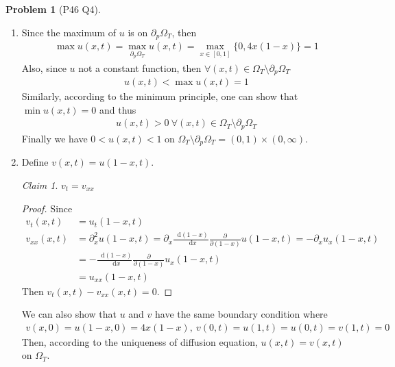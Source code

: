 \documentclass[twoside,11pt]{article}
\renewcommand*\d{\mathop{}\!\mathrm{d}}
\theoremstyle{definition}
\newtheorem{problem}{Problem}
\theoremstyle{remark}
\newtheorem*{claim}{Claim}
\begin{document}
\newpage
\begin{problem}[P46 Q4]\
    \begin{enumerate}
        \item Since the maximum of $u$ is on $\partial_p\Omega_T$, then 
        \begin{align*}
            \max u(x, t) = \max_{\partial_p\Omega_T}u(x, t) = \max_{x\in[0, 1]}\{0, 4x(1-x)\} = 1
        \end{align*}
        Also, since $u$ not a constant function, then $\forall (x, t)\in\Omega_T\setminus\partial_p\Omega_T$
        \begin{align*}
            u(x, t) < \max u(x, t) = 1
        \end{align*}
        Similarly, according to the minimum principle, one can show that $\min u(x, t) = 0$
        and thus
        \begin{align*}
            u(x, t) > 0\ \forall (x, t)\in\Omega_T\setminus\partial_p\Omega_T
        \end{align*}
        Finally we have $0 < u(x, t) < 1$ on 
        $\Omega_T\setminus\partial_p\Omega_T=(0,1)\times (0, \infty)$.

        \item Define $v(x, t) = u(1-x, t)$.
        \begin{claim}
            $v_t=v_{xx}$
        \end{claim}
        \begin{proof}
        Since
        \begin{align*}
            v_t(x, t) &= u_t(1-x, t)\\
            v_{xx}(x, t) &= \partial_x^2u(1-x, t) 
            = \partial_x\frac{\d (1-x)}{\d x}\frac{\partial}{\partial (1-x)}u(1-x, t) = 
            -\partial_x u_x(1-x, t)\\
            &= -\frac{\d (1-x)}{\d x}\frac{\partial}{\partial (1-x)}u_x(1-x, t)\\
            &= u_{xx}(1-x, t)
        \end{align*}
        Then $v_t(x, t)-v_{xx}(x, t) = 0$.
        \end{proof}
        We can also show that $u$ and $v$ have the same boundary condition where
        \begin{align*}
            v(x, 0) = u(1-x,0) = 4x(1-x),\ v(0, t) = u(1, t) = u(0, t) = v(1, t) = 0
        \end{align*}
        Then, according to the uniqueness of diffusion equation, $u(x,t)=v(x,t)$ on $\Omega_T$.


\end{enumerate}
\end{problem}
\end{document}
